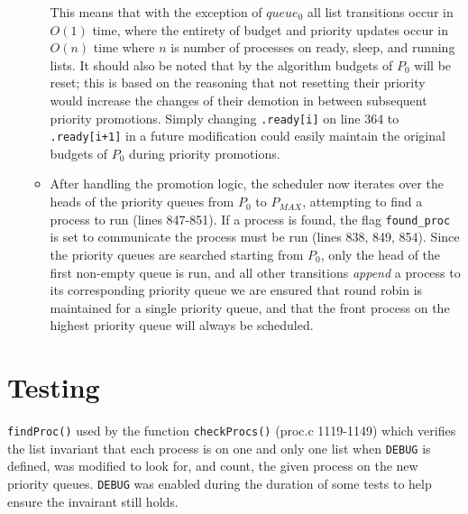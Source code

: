 \documentclass[11pt,letterpaper]{report}
\begin{document}
\begin{itemize}
\begin{itemize}
				This means that with the exception of $queue_{0}$ all list transitions occur in $O(1)$ time, where the entirety of budget and priority updates occur in $O(n)$ time where
				$n$ is number of processes on ready, sleep, and running lists. It should also be noted that by the algorithm budgets of $P_0$ will be reset; this is based on the reasoning that
				not resetting their priority would increase the changes of their demotion in between subsequent priority promotions. Simply changing {\tt .ready[i]} on line 364 to 
				{\tt .ready[i+1]} in a future modification could easily maintain the original budgets of $P_0$ during priority promotions.
				\item After handling the promotion logic, the scheduler now iterates over the heads of the priority queues from $P_0$ to $P_{MAX}$, attempting to find a process to run 
				(lines 847-851). If a process is found, the flag {\tt found\_proc} is set to communicate the process must be run (lines 838, 849, 854). Since the priority queues
				are searched starting from $P_0$, only the head of the first non-empty queue is run, and all other transitions \emph{append} a process to its corresponding priority queue we are ensured that round robin 
				is maintained for a single priority queue, and that the front process on the highest priority queue will always be scheduled. 
			\end{itemize}
	\end{itemize}



	\newpage
	
	
	\section*{Testing}
	{\tt findProc()} used by the function {\tt checkProcs()} (proc.c 1119-1149) which verifies the list invariant that each process is on one and only one list when {\tt DEBUG} is defined,
	 was modified to look for, and count, the given process on the new priority queues. {\tt DEBUG} was enabled during the duration of some tests to help ensure the invairant
	 still holds.
\end{document}

